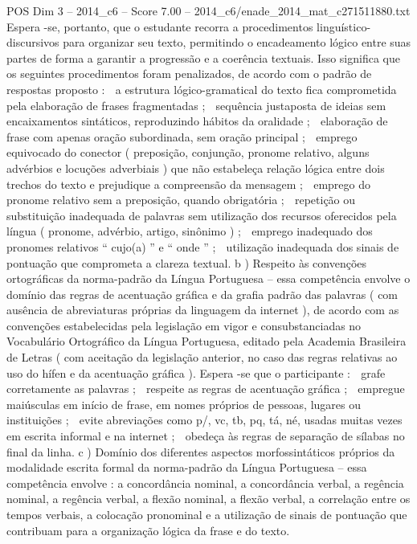 \begin{textsample}{POS Dim 3 – 2014\_c6 – Score 7.00 – 2014\_c6/enade\_2014\_mat\_c271511880.txt}
Espera -se, portanto, que o estudante recorra a procedimentos linguístico-discursivos para organizar seu texto, permitindo o encadeamento lógico entre suas partes de forma a garantir a progressão e a coerência textuais.
Isso significa que os seguintes procedimentos foram penalizados, de acordo com o padrão de respostas proposto :  a estrutura lógico-gramatical do texto fica comprometida pela elaboração de frases fragmentadas ;  sequência justaposta de ideias sem encaixamentos sintáticos, reproduzindo hábitos da oralidade ;  elaboração de frase com apenas oração subordinada, sem oração principal ;  emprego equivocado do conector ( preposição, conjunção, pronome relativo, alguns advérbios e locuções adverbiais ) que não estabeleça relação lógica entre dois trechos do texto e prejudique a compreensão da mensagem ;  emprego do pronome relativo sem a preposição, quando obrigatória ;  repetição ou substituição inadequada de palavras sem utilização dos recursos oferecidos pela língua ( pronome, advérbio, artigo, sinônimo ) ;  emprego inadequado dos pronomes relativos “ cujo(a) ” e “ onde ” ;  utilização inadequada dos sinais de pontuação que comprometa a clareza textual. b ) Respeito às convenções ortográficas da norma-padrão da Língua Portuguesa – essa competência envolve o domínio das regras de acentuação gráfica e da grafia padrão das palavras ( com ausência de abreviaturas próprias da linguagem da internet ), de acordo com as convenções estabelecidas pela legislação em vigor e consubstanciadas no Vocabulário Ortográfico da Língua Portuguesa, editado pela Academia Brasileira de Letras ( com aceitação da legislação anterior, no caso das regras relativas ao uso do hífen e da acentuação gráfica ).
Espera -se que o participante :  grafe corretamente as palavras ;  respeite as regras de acentuação gráfica ;  empregue maiúsculas em início de frase, em nomes próprios de pessoas, lugares ou instituições ;  evite abreviações como p/, vc, tb, pq, tá, né, usadas muitas vezes em escrita informal e na internet ;  obedeça às regras de separação de sílabas no final da linha. c ) Domínio dos diferentes aspectos morfossintáticos próprios da modalidade escrita formal da norma-padrão da Língua Portuguesa – essa competência envolve : a concordância nominal, a concordância verbal, a regência nominal, a regência verbal, a flexão nominal, a flexão verbal, a correlação entre os tempos verbais, a colocação pronominal e a utilização de sinais de pontuação que contribuam para a organização lógica da frase e do texto.

\end{textsample}
